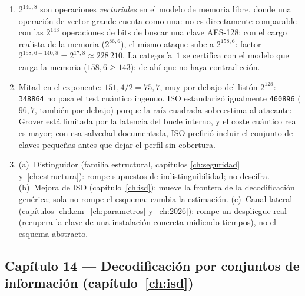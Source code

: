 \documentclass[11pt,a4paper,oneside]{report}
\begin{document}
\begin{enumerate}[leftmargin=1.9em,itemsep=4pt]
        puede mejorar (2025--2026 lo mostró). En la práctica, el
        que sostiene las decisiones es (c): las categorías y los
        márgenes se calculan con el mejor ataque conocido; la
        conjetura es el marco de la promesa.
  \item $2^{140{,}8}$ son operaciones \emph{vectoriales} en el
        modelo de memoria libre, donde una operación de vector
        grande cuenta como una: no es directamente comparable con
        las $2^{143}$ operaciones de bits de buscar una clave
        AES-128; con el cargo realista de la memoria ($2^{86{,}6}$),
        el mismo ataque sube a $2^{158{,}6}$: factor
        $2^{158{,}6-140{,}8}=2^{17{,}8}\approx228\,210$. La
        categoría~$1$ se certifica con el modelo que carga la
        memoria ($158{,}6\ge143$): de ahí que no haya
        contradicción.
  \item Mitad en el exponente: $151{,}4/2=75{,}7$, muy por debajo
        del listón $2^{128}$: \texttt{348864} no pasa el test
        cuántico ingenuo. ISO estandarizó igualmente
        \texttt{460896} ($96{,}7$, también por debajo) porque la
        raíz cuadrada sobreestima al atacante: Grover está limitada
        por la latencia del bucle interno, y el coste cuántico real
        es mayor; con esa salvedad documentada, ISO prefirió
        incluir el conjunto de claves pequeñas antes que dejar el
        perfil sin cobertura.
  \item (a)~Distinguidor (familia estructural, capítulos
        \ref{ch:seguridad} y~\ref{ch:estructura}): rompe supuestos
        de indistinguibilidad; no descifra. (b)~Mejora de ISD
        (capítulo~\ref{ch:isd}): mueve la frontera de la
        decodificación genérica; sola no rompe el esquema: cambia
        la estimación. (c)~Canal lateral (capítulos
        \ref{ch:kem}--\ref{ch:parametros} y~\ref{ch:2026}): rompe
        un despliegue real (recupera la clave de una instalación
        concreta midiendo tiempos), no el esquema abstracto.
\end{enumerate}

\subsection*{Capítulo 14 --- Decodificación por conjuntos de
información (capítulo~\ref{ch:isd})}
\end{document}
